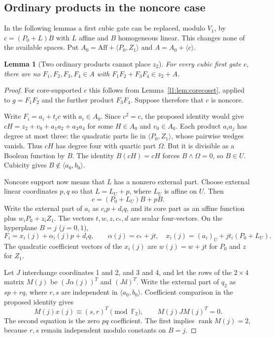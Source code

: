 \documentclass[11pt,a4paper]{article}
\theoremstyle{plain}
\newtheorem{lemma}[theorem]{Lemma}
\theoremstyle{remark}
\newcommand{\Aff}{\mathrm{Aff}}
\newcommand{\rk}{\operatorname{rank}}
\begin{document}
\subsection{Ordinary products in the noncore case}
In the following lemmas a first cubic gate can be replaced, modulo $V_1$, by $c=(P_0+L)B$ with $L$ affine and $B$ homogeneous linear. This changes none of the available spaces. Put $A_0=\Aff+\langle P_0,Z_1\rangle$ and $A=A_0+\langle c\rangle$.

\begin{lemma}[Two ordinary products cannot place $z_2$]\label{l1:lem:ordinarypair}
For every cubic first gate $c$, there are no $F_1,F_2,F_3,F_4\in A$ with $F_1F_2+F_3F_4\in z_2+A$.
\end{lemma}
\begin{proof}
For core-supported $c$ this follows from Lemma~\ref{l1:lem:corecoset}, applied to $g=F_1F_2$ and the further product $F_3F_4$. Suppose therefore that $c$ is noncore.

Write $F_i=a_i+t_i c$ with $a_i\in A_0$. Since $c^2=c$, the proposed identity would give $cH=z_2+v_0+a_1a_2+a_3a_4$ for some $H\in A_0$ and $v_0\in A_0$. Each product $a_i a_j$ has degree at most three: the quadratic parts lie in $\langle P_0,Z_1\rangle$, whose pairwise wedges vanish. Thus $cH$ has degree four with quartic part $\Omega$. But it is divisible as a Boolean function by $B$. The identity $B(cH)=cH$ forces $B\wedge\Omega=0$, so $B\in U$. Cubicity gives $B\notin\langle a_0,b_0\rangle$.

Noncore support now means that $L$ has a nonzero external part. Choose external linear coordinates $p,q$ so that $L=L_U+p$, where $L_U$ is affine on $U$. Then
\[
c=(P_0+L_U)B+pB.
\]
Write the external part of $a_i$ as $c_i p+d_iq$, and its core part as an affine function plus $w_iP_0+z_iZ_1$. The vectors $t,w,z,c_*,d$ are scalar four-vectors. On the hyperplane $B=j$ ($j=0,1$),
\[
F_i=x_i(j)+\alpha_i(j)p+d_iq,\qquad
\alpha(j)=c_*+jt,\quad
x_i(j)=(a_i)_U+jt_i(P_0+L_U).
\]
The quadratic coefficient vectors of the $x_i(j)$ are $w(j)=w+jt$ for $P_0$ and $z$ for $Z_1$.

Let $J$ interchange coordinates 1 and 2, and 3 and 4, and let the rows of the $2\times4$ matrix $M(j)$ be $(J\alpha(j))^T$ and $(Jd)^T$. Write the external part of $q_2$ as $sp+rq$, where $r,s$ are independent in $\langle a_0,b_0\rangle$. Coefficient comparison in the proposed identity gives
\[
M(j)x(j)\equiv(s,r)^T\pmod{\mathbb F_2},\qquad
M(j)JM(j)^T=0.
\]
The second equation is the zero $pq$ coefficient. The first implies $\rk M(j)=2$, because $r,s$ remain independent modulo constants on $B=j$.


\end{proof}
\end{document}
